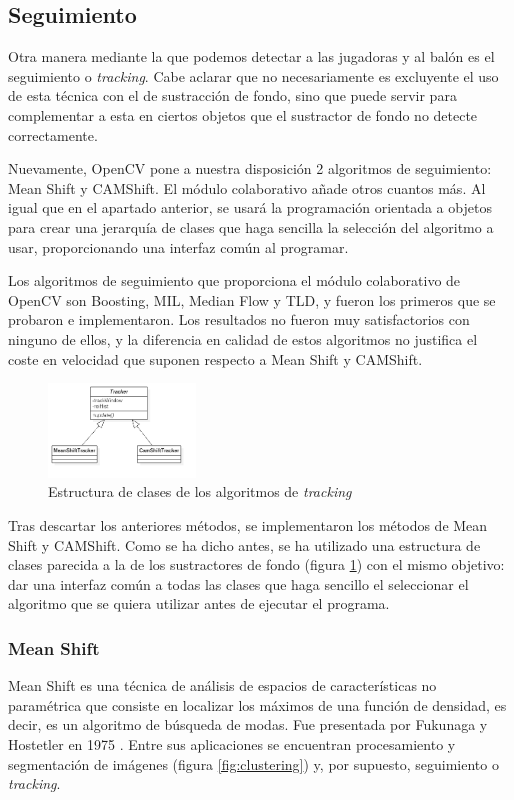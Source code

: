 \subsection{Seguimiento}
Otra manera mediante la que podemos detectar a las jugadoras y al balón es el seguimiento o \textit{tracking}. Cabe aclarar que no necesariamente es excluyente el uso de esta técnica con el de sustracción de fondo, sino que puede servir para complementar a esta en ciertos objetos que el sustractor de fondo no detecte correctamente.

Nuevamente, OpenCV pone a nuestra disposición 2 algoritmos de seguimiento: Mean Shift y CAMShift. El módulo colaborativo añade otros cuantos más. Al igual que en el apartado anterior, se usará la programación orientada a objetos para crear una jerarquía de clases que haga sencilla la selección del algoritmo a usar, proporcionando una interfaz común al programar.

Los algoritmos de seguimiento que proporciona el módulo colaborativo de OpenCV son Boosting, MIL, Median Flow y TLD, y fueron los primeros que se probaron e implementaron. Los resultados no fueron muy satisfactorios con ninguno de ellos, y la diferencia en calidad de estos algoritmos no justifica el coste en velocidad que suponen respecto a Mean Shift y CAMShift.

\begin{figure}
    \centering
    \includegraphics[width=0.35\textwidth]{images/trackers}
    \caption{Estructura de clases de los algoritmos de \textit{tracking}}
    \label{fig:trackers}
\end{figure}

Tras descartar los anteriores métodos, se implementaron los métodos de Mean Shift y CAMShift. Como se ha dicho antes, se ha utilizado una estructura de clases parecida a la de los sustractores de fondo (figura \ref{fig:trackers}) con el mismo objetivo: dar una interfaz común a todas las clases que haga sencillo el seleccionar el algoritmo que se quiera utilizar antes de ejecutar el programa.

\subsubsection*{Mean Shift}
Mean Shift es una técnica de análisis de espacios de características no paramétrica que consiste en localizar los máximos de una función de densidad, es decir, es un algoritmo de búsqueda de modas. Fue presentada por Fukunaga y Hostetler en 1975 \cite{1055330}. Entre sus aplicaciones se encuentran procesamiento y segmentación de imágenes (figura \ref{fig:clustering}) y, por supuesto, seguimiento o \textit{tracking}.

